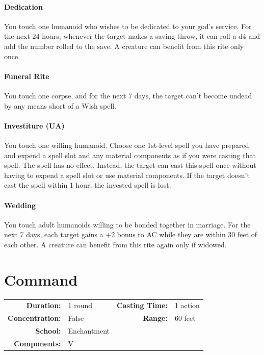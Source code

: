 \documentclass[12pt,showtrims]{memoir}
\begin{document}
\paragraph{Dedication} You touch one humanoid who wishes to be dedicated to your god’s service. For the next 24 hours, whenever the target makes a saving throw, it can roll a d4 and add the number rolled to the save. A creature can benefit from this rite only once.

\paragraph{Funeral Rite} You touch one corpse, and for the next 7 days, the target can’t become undead by any means short of a Wish spell.

\paragraph{Investiture (UA)} You touch one willing humanoid. Choose one 1st-level spell you have prepared and expend a spell slot and any material components as if you were casting that spell. The spell has no effect. Instead, the target can cast this spell once without having to expend a spell slot or use material components. If the target doesn’t cast the spell within 1 hour, the invested spell is lost.

\paragraph{Wedding} You touch adult humanoids willing to be bonded together in marriage. For the next 7 days, each target gains a +2 bonus to AC while they are within 30 feet of each other. A creature can benefit from this rite again only if widowed.
\newpage
\section*{Command}

{
\small\centering\vspace{-6pt}
\begin{tabular}{rlrl}
\toprule

\textbf{Duration:} & 1 round &
\textbf{Casting Time:} & 1 action \\
\textbf{Concentration:} & False &
\textbf{Range:} & 60 feet \\
\textbf{School:} & Enchantment \\
\textbf{Components:} & \multicolumn{3}{p{0.7\textwidth}}{V}\\

\bottomrule
\end{tabular}
}
\end{document}
